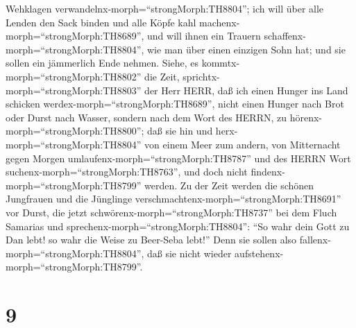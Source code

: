 Wehklagen verwandelnx-morph=``strongMorph:TH8804''; ich will über alle
Lenden den Sack binden und alle Köpfe kahl
machenx-morph=``strongMorph:TH8689'', und will ihnen ein Trauern
schaffenx-morph=``strongMorph:TH8804'', wie man über einen einzigen Sohn
hat; und sie sollen ein jämmerlich Ende nehmen.  Siehe, es
kommtx-morph=``strongMorph:TH8802'' die Zeit,
sprichtx-morph=``strongMorph:TH8803'' der Herr HERR, daß ich einen
Hunger ins Land schicken werdex-morph=``strongMorph:TH8689'', nicht
einen Hunger nach Brot oder Durst nach Wasser, sondern nach dem Wort des
HERRN, zu hörenx-morph=``strongMorph:TH8800'';  daß sie hin
und herx-morph=``strongMorph:TH8804'' von einem Meer zum andern, von
Mitternacht gegen Morgen umlaufenx-morph=``strongMorph:TH8787'' und des
HERRN Wort suchenx-morph=``strongMorph:TH8763'', und doch nicht
findenx-morph=``strongMorph:TH8799'' werden.  Zu der Zeit
werden die schönen Jungfrauen und die Jünglinge
verschmachtenx-morph=``strongMorph:TH8691'' vor Durst,  die
jetzt schwörenx-morph=``strongMorph:TH8737'' bei dem Fluch Samarias und
sprechenx-morph=``strongMorph:TH8804'': ``So wahr dein Gott zu Dan lebt!
so wahr die Weise zu Beer-Seba lebt!'' Denn sie sollen also
fallenx-morph=``strongMorph:TH8804'', daß sie nicht wieder
aufstehenx-morph=``strongMorph:TH8799''.

\hypertarget{section-8}{%
\section{9}\label{section-8}}

